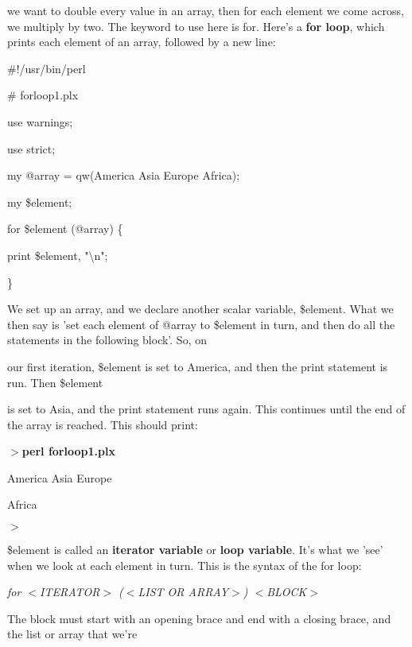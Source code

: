 \documentclass[a4paper,11pt]{book}
\begin{document}
\noindent we want to  double every value  in  an  array,  then  for  each  element  we  come across,  we  multiply  by two.  The  keyword to use here  is  for.  Here's  a  \textbf{for loop},  which  prints  each  element  of  an  array, followed by a new line:

\noindent 

\noindent \#!/usr/bin/perl

\noindent \# forloop1.plx

\noindent use warnings;

\noindent use strict;

\noindent 

\noindent my @array = qw(America Asia Europe Africa);

\noindent my \$element;

\noindent for \$element (@array) \{

\noindent print \$element, "\textbackslash n";

\noindent \}

\noindent 

\noindent We set up an array, and we declare another scalar variable, \$element. What we then say is 'set each element of @array to \$element in turn, and then do all the statements in the following block'. So, on

\noindent our first iteration, \$element is set to America, and then the print statement is run. Then \$element

\noindent is set to Asia, and the print statement runs again. This continues until the end of the array is reached. This should print:

\noindent $>$\textbf{perl forloop1.plx}

\noindent America Asia Europe

\noindent Africa

\noindent $>$

\noindent 

\noindent \$element is called an \textbf{iterator variable }or \textbf{loop variable}. It's what we 'see' when we look at each element in turn. This is the syntax of the for loop:

\noindent 

\noindent \textit{for $<$ITERATOR$>$ ($<$LIST OR ARRAY$>$) $<$BLOCK$>$}

\noindent 

\noindent 

\noindent The block must start with an opening brace and end with a closing brace, and the list or array that we're
\end{document}
